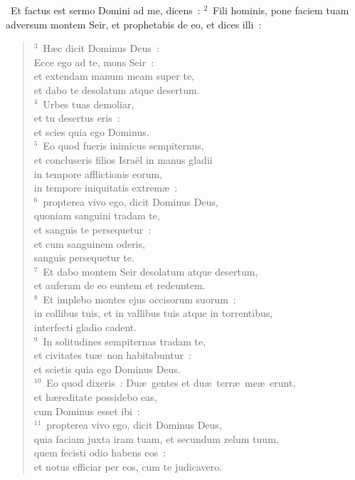 ~Et factus est sermo Domini ad me, dicens~:
${}^{2}$~Fili hominis, pone faciem tuam adversum montem Seir, et prophetabis de eo, et dices illi~:
\begin{flushleft}\begin{verse}${}^{3}$~H\ae c dicit Dominus Deus~:\\ Ecce ego ad te, mons Seir~:\\ et extendam manum meam super te,\\ et dabo te desolatum atque desertum.\\
${}^{4}$~Urbes tuas demoliar,\\ et tu desertus eris~:\\ et scies quia ego Dominus.\\
${}^{5}$~Eo quod fueris inimicus sempiternus,\\ et concluseris filios Isra\"el in manus gladii\\ in tempore afflictionis eorum,\\ in tempore iniquitatis extrem\ae~:\\
${}^{6}$~propterea vivo ego, dicit Dominus Deus,\\ quoniam sanguini tradam te,\\ et sanguis te persequetur~:\\ et cum sanguinem oderis,\\ sanguis persequetur te.\\
${}^{7}$~Et dabo montem Seir desolatum atque desertum,\\ et auferam de eo euntem et redeuntem.\\
${}^{8}$~Et implebo montes ejus occisorum suorum~:\\ in collibus tuis, et in vallibus tuis atque in torrentibus,\\ interfecti gladio cadent.\\
${}^{9}$~In solitudines sempiternas tradam te,\\ et civitates tu\ae\ non habitabuntur~:\\ et scietis quia ego Dominus Deus.\\
${}^{10}$~Eo quod dixeris~: Du\ae\ gentes et du\ae\ terr\ae\ me\ae\ erunt,\\ et h\ae reditate possidebo eas,\\ cum Dominus esset ibi~:\\
${}^{11}$~propterea vivo ego, dicit Dominus Deus,\\ quia faciam juxta iram tuam, et secundum zelum tuum,\\ quem fecisti odio habens eos~:\\ et notus efficiar per eos, cum te judicavero.\\

\end{verse}
\end{flushleft}
